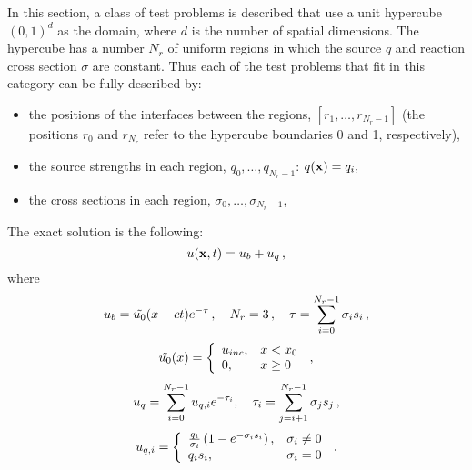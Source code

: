 In this section, a class of test problems is described that use a unit
hypercube $(0,1)^d$ as the domain, where $d$ is the number of
spatial dimensions. The hypercube has a number $N_r$ of uniform regions
in which the source $q$ and reaction cross section $\sigma$ are
constant. Thus each of the test problems that fit in this
category can be fully described by:
\begin{itemize}
  \item the positions of the interfaces between the regions,
    $[r_1,\ldots,r_{N_r-1}]$ (the positions $r_0$ and $r_{N_r}$
    refer to the hypercube boundaries 0 and 1, respectively),
  \item the source strengths in each region, $q_0,\ldots,q_{N_r-1}$:
    $q(\mathbf{x}) = q_i,\qquad $
  \item the cross sections in each region, $\sigma_0,\ldots,\sigma_{N_r-1}$,
\end{itemize}

The exact solution is the following:
\[
  u(\mathbf{x},t) = u_b + u_q \,,
\]
where
\[
  u_b=\tilde{u_0}(x-ct)e^{-\tau} \,,
        \quad N_r=3\,,\quad
        \tau = \sum\limits_{i=0}^{N_r-1} \sigma_i s_i \,,
\]
\[
  \tilde{u_0}(x) = \left\{\begin{array}{l l}
        u_{inc}, & x<x_0\\
        0,       & x\geq 0
     \end{array}\right. \,,
\]
\[
  u_q=\sum\limits_{i=0}^{N_r-1}u_{q,i}e^{-\tau_i},\quad
        \tau_i = \sum\limits_{j=i+1}^{N_r-1} \sigma_j s_j \,,
\]
\[
  u_{q,i} = \left\{\begin{array}{l l}
        \frac{q_i}{\sigma_i}\left(1-e^{-\sigma_i s_i}\right), & \sigma_i\neq 0\\
        q_i s_i, & \sigma_i = 0
        \end{array}\right. \,.
\]
